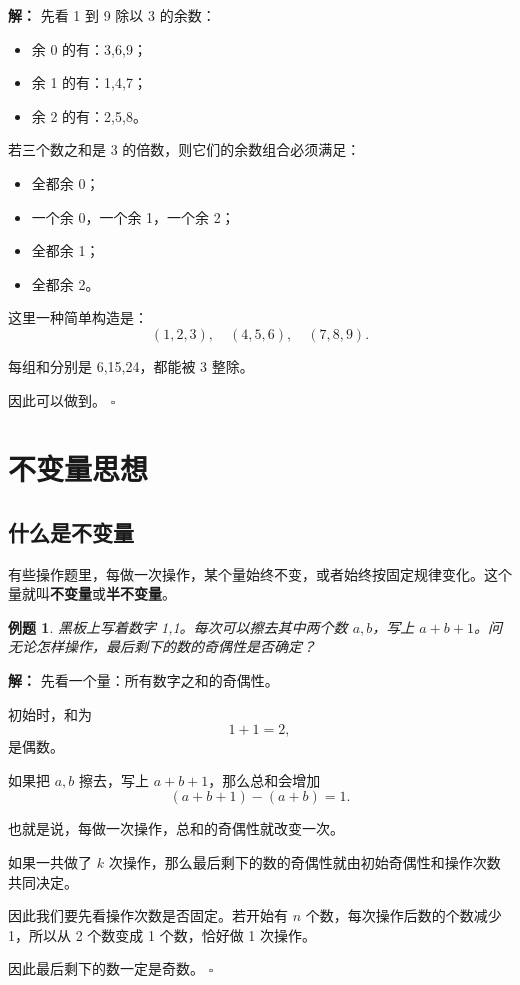 \documentclass[11pt,a4paper,fontset=fandol]{ctexart}
\theoremstyle{formaltheorem}
\theoremstyle{formalexample}
\newtheorem{example}{例题}[section]
\newenvironment{solution}{\par\noindent\textbf{解：}}{\hfill$\square$\par}
\begin{document}
\begin{solution}
先看 1 到 9 除以 3 的余数：
\begin{itemize}
  \item 余 0 的有：3,6,9；
  \item 余 1 的有：1,4,7；
  \item 余 2 的有：2,5,8。
\end{itemize}

若三个数之和是 3 的倍数，则它们的余数组合必须满足：
\begin{itemize}
  \item 全都余 0；
  \item 一个余 0，一个余 1，一个余 2；
  \item 全都余 1；
  \item 全都余 2。
\end{itemize}

这里一种简单构造是：
\[
(1,2,3),\quad (4,5,6),\quad (7,8,9).
\]

每组和分别是 6,15,24，都能被 3 整除。

因此可以做到。
\end{solution}

\section{不变量思想}

\subsection{什么是不变量}
有些操作题里，每做一次操作，某个量始终不变，或者始终按固定规律变化。这个量就叫\textbf{不变量}或\textbf{半不变量}。

\begin{example}
黑板上写着数字 1,1。每次可以擦去其中两个数 $a,b$，写上 $a+b+1$。问无论怎样操作，最后剩下的数的奇偶性是否确定？
\end{example}

\begin{solution}
先看一个量：所有数字之和的奇偶性。

初始时，和为
\[
1+1=2,
\]
是偶数。

如果把 $a,b$ 擦去，写上 $a+b+1$，那么总和会增加
\[
(a+b+1)-(a+b)=1.
\]

也就是说，每做一次操作，总和的奇偶性就改变一次。

如果一共做了 $k$ 次操作，那么最后剩下的数的奇偶性就由初始奇偶性和操作次数共同决定。

因此我们要先看操作次数是否固定。若开始有 $n$ 个数，每次操作后数的个数减少 1，所以从 2 个数变成 1 个数，恰好做 1 次操作。

因此最后剩下的数一定是奇数。
\end{solution}
\end{document}
